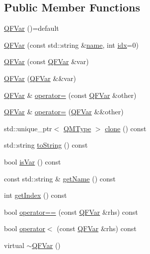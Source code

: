 \subsection*{Public Member Functions}
\begin{DoxyCompactItemize}
\item 
\hyperlink{classQuickMath_1_1QFVar_a676bc9879b6d6079800060d2554080b2}{Q\+F\+Var} ()=default
\item 
\hyperlink{classQuickMath_1_1QFVar_a9013e1baba39838798a9f5eaccb25e2a}{Q\+F\+Var} (const std\+::string \&\hyperlink{classQuickMath_1_1QFVar_a39703d5b8aa86d92e22b344e92ccfd77}{name}, int \hyperlink{classQuickMath_1_1QFVar_ac878e4d5217813ee3fca965a9f6a6b1c}{idx}=0)
\item 
\hyperlink{classQuickMath_1_1QFVar_af95d9389974eff58ac4422f0757835a2}{Q\+F\+Var} (const \hyperlink{classQuickMath_1_1QFVar}{Q\+F\+Var} \&var)
\item 
\hyperlink{classQuickMath_1_1QFVar_ad700d482b2e7a0d6c4d2a8b9dcf416a0}{Q\+F\+Var} (\hyperlink{classQuickMath_1_1QFVar}{Q\+F\+Var} \&\&var)
\item 
\hyperlink{classQuickMath_1_1QFVar}{Q\+F\+Var} \& \hyperlink{classQuickMath_1_1QFVar_a96ae8db7661f61f4e17e5c14cc1ff7c8}{operator=} (const \hyperlink{classQuickMath_1_1QFVar}{Q\+F\+Var} \&other)
\item 
\hyperlink{classQuickMath_1_1QFVar}{Q\+F\+Var} \& \hyperlink{classQuickMath_1_1QFVar_af4d5f5644a7b53cd4f5eb72a9a2df3f4}{operator=} (\hyperlink{classQuickMath_1_1QFVar}{Q\+F\+Var} \&\&other)
\item 
std\+::unique\+\_\+ptr$<$ \hyperlink{classQuickMath_1_1QMType}{Q\+M\+Type} $>$ \hyperlink{classQuickMath_1_1QFVar_a07f3155c995f0cd7dfee1dca2c8ca4d6}{clone} () const 
\item 
std\+::string \hyperlink{classQuickMath_1_1QFVar_a13ed0152f1920b3d7b0f4c86b64d0333}{to\+String} () const 
\item 
bool \hyperlink{classQuickMath_1_1QFVar_a1e5a49b3cce6d8d14af56f23a88ea01d}{is\+Var} () const 
\item 
const std\+::string \& \hyperlink{classQuickMath_1_1QFVar_a5940092ea947a3069a53a7a279062fbc}{get\+Name} () const 
\item 
int \hyperlink{classQuickMath_1_1QFVar_ae12ac2261ad4bf78ec5e21db5ca3b4e3}{get\+Index} () const 
\item 
bool \hyperlink{classQuickMath_1_1QFVar_a9a42646ecb85e763ce5eb5e0661df47a}{operator==} (const \hyperlink{classQuickMath_1_1QFVar}{Q\+F\+Var} \&rhs) const 
\item 
bool \hyperlink{classQuickMath_1_1QFVar_a37631d1bc1d43d0a26287caacb5996e1}{operator$<$} (const \hyperlink{classQuickMath_1_1QFVar}{Q\+F\+Var} \&rhs) const 
\item 
virtual \hyperlink{classQuickMath_1_1QFVar_aeddabc1cf78d984b41314eba81376b79}{$\sim$\+Q\+F\+Var} ()
\end{DoxyCompactItemize}
